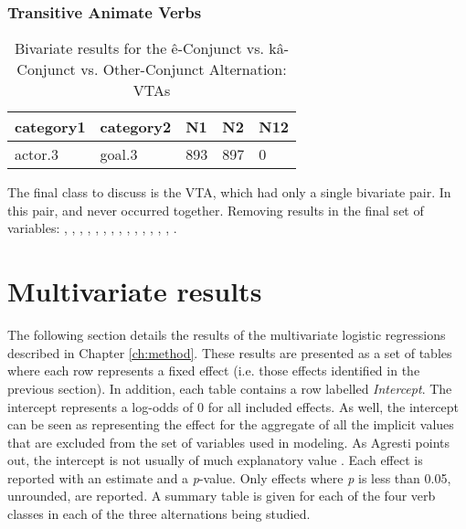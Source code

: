 \subsubsection{Transitive Animate Verbs}

\begin{table}[H]
\centering
\begin{tabular}{lllll}
\toprule
category1        & category2  & N1   & N2   & N12 \\
\midrule
actor.3 & goal.3 & 893 & 897 & 0 \\
\bottomrule
\end{tabular}
\caption{
   Bivariate results for the ê-Conjunct vs. kâ-Conjunct vs. Other-Conjunct Alternation: VTAs \\ \label{tab:tacnjuni}
  }
\end{table}

The final class to discuss is the VTA, which had only a single bivariate pair. In this pair,  and  never occurred together. Removing  results in the final set of variables: , , , , , , , , , , , , , , .




\section{Multivariate results}

The following section details the results of the multivariate logistic regressions described in Chapter \ref{ch:method}. These results are presented as a set of tables where each row represents a fixed effect (i.e. those effects identified in the previous section). In addition, each table contains a row labelled \textit{Intercept}. The intercept represents a log-odds of 0 for all included effects. As well, the intercept can be seen as representing the effect for the aggregate of all the implicit values that are excluded from the set of variables used in modeling. As Agresti points out, the intercept is not usually of much explanatory value \citep[165]{agresti2013categorical}. Each effect is reported with an estimate and a \textit{p}-value. Only effects where \textit{p} is less than 0.05, unrounded, are reported. A summary table is given for each of the four verb classes in each of the three alternations being studied. 

